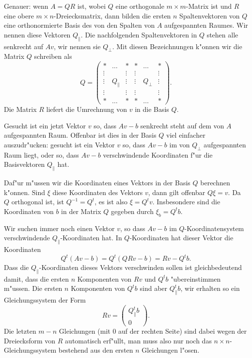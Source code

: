 Genauer: wenn $A=QR$ ist, wobei $Q$ eine orthogonale $m\times m$-Matrix
ist und $R$ eine obere $m\times n$-Dreiecksmatrix, dann bilden die
ersten $n$ Spaltenvektoren von $Q$ eine orthonormierte Basis des
von den Spalten von $A$ aufgespannten Raumes. Wir nennen diese Vektoren
$Q_{\|}$.
Die nachfolgenden Spaltenvektoren
in $Q$ stehen alle senkrecht auf $Av$, wir nennen sie $Q_{\perp}$.
Mit diesen Bezeichnungen k"onnen wir die Matrix $Q$ schreiben als
\[
Q=\begin{pmatrix}
*     &\dots &     *&      *&\dots   &*     \\
\vdots&      &\vdots&\vdots &        &\vdots\\
\vdots&Q_{\|}&\vdots&\vdots&Q_{\perp}&\vdots\\
\vdots&      &\vdots&\vdots &        &\vdots\\
*     &\dots &     *&      *&\dots   &*     
\end{pmatrix}.
\]
Die Matrix $R$ liefert die Umrechnung von $v$ in die Basis $Q$.

Gesucht ist ein jetzt Vektor $v$ so, dass
$Av-b$ senkrecht steht auf dem von $A$ aufgespannten Raum.
Offenbar ist dies in der Basis $Q$ viel einfacher auszudr"ucken:
gesucht ist ein Vektor $v$ so, dass $Av-b$ im von $Q_{\perp}$
aufgespannten Raum liegt, oder so, dass $Av-b$ verschwindende Koordinaten
f"ur die Basisvektoren $Q_{\|}$ hat.

Daf"ur m"ussen wir die Koordinaten eines Vektors in der Basis $Q$
berechnen k"onnen. Sind $\xi$ diese Koordinaten des Vektors $v$,
dann gilt offenbar $Q\xi = v$. Da $Q$ orthogonal ist, ist $Q^{-1}=Q^t$,
es ist also $\xi=Q^tv$. Insbesondere sind die Koordinaten von $b$ in der
Matrix $Q$ gegeben durch $\xi_b=Q^tb$. 

Wir suchen immer noch einen Vektor $v$, so dass $Av-b$ im $Q$-Koordinatensystem
verschwindende $Q_{\|}$-Koordinaten hat. In $Q$-Koordinaten hat dieser
Vektor die Koordinaten
\[
Q^t(Av-b)=Q^t(QRv-b)=Rv-Q^tb.
\]
Dass die $Q_{\|}$-Koordinaten dieses Vektors verschwinden sollen ist
gleichbedeutend damit, dass die ersten $n$ Komponenten von 
$Rv$ und $Q^tb$ "ubereinstimmen m"ussen. Die ersten $n$ Komponenten
von $Q^tb$ sind aber $Q_{\|}^tb$, wir erhalten so ein Gleichungssystem
der Form
\begin{equation}
Rv=\begin{pmatrix}
Q_{\|}^tb\\
0
\end{pmatrix}.
\label{qr-leastsquares}
\end{equation}
Die letzten $m-n$ Gleichungen (mit $0$ auf der rechten Seite) sind dabei
wegen der Dreiecksform von $R$ automatisch erf"ullt, man muss also nur
noch das $n\times n$-Gleichungssystem bestehend aus den ersten $n$
Gleichungen l"osen. 

